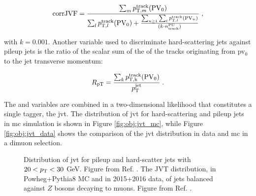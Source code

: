 \begin{equation}
{\rm corrJVF} = \frac{\sum_m{p_{{\rm T}, m}^{{\rm track}}({\rm PV}_0)}}{\sum_l p_{{\rm T}, l}^{{\rm track}}({\rm PV}_0) + \frac{\sum_{n\geq1}\sum_l p_{{\rm T}, l}^{{\rm track}}({\rm PV}_n)}{ (k \cdot n_\mathrm{track}^\mathrm{PU})}} \; , \nonumber
\end{equation}

\noindent with $k=0.001$. Another variable used to discriminate hard-scattering jets against pileup jets is the ratio of the scalar
sum of the \pt of the tracks originating from \gls{pv}$_0$ to the jet transverse momentum:


\begin{equation}
R_\mathrm{pT} = \frac{\sum_k{p_{\rm{T}, k}^{{\rm track}}({\rm PV}_0)}}{p_\mathrm{T}^\mathrm{jet}} \;.
\label{eq:obj:rpt}
\end{equation}

The \cJVF and \RpT variables are combined in a two-dimensional likelihood that constitutes a single tagger, the \gls{jvt}. 
The distribution of \gls{jvt} for hard-scattering and pileup jets in \gls{mc} simulation is shown in Figure \ref{fig:obj:jvt_mc},
while Figure \ref{fig:obj:jvt_data} shows the comparison of the \gls{jvt} distribution in data and \gls{mc} in a dimuon selection.


\begin{figure}[h]
\begin{center}
\end{center}
 \caption{ Distribution of \gls{jvt} for pileup and hard-scatter jets with $20 < p_{\rm T} < 30$ GeV. Figure from Ref. \cite{ATLAS-CONF-2014-018}.  The JVT distribution, in Powheg+Pythia8 MC and in 2015+2016 data, of jets balanced against $Z$ bosons decaying to muons. Figure from Ref. \cite{jvtpublicplots}.}
  \label{fig:obj:jvt}
\end{figure}

